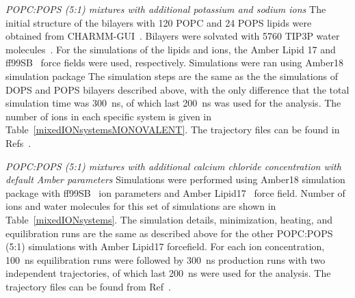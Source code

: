 \documentclass[journal=jpcbfk,manuscript=article]{achemso}
\begin{document}
\noindent
{\it POPC:POPS (5:1) mixtures with additional potassium and sodium ions} 
The initial structure of the bilayers with 120 POPC and 24 POPS lipids were obtained from CHARMM-GUI~\cite{lee16,jo18}.
Bilayers were solvated with 5760 TIP3P water molecules~\cite{jorgensen1983comparison}. For the simulations of the lipids and ions,
the Amber Lipid 17 \cite{gould18} and ff99SB~\cite{aqvist90} force fields were used, respectively.
Simulations were ran using Amber18 simulation package \cite{amber18md} 
The simulation steps are the same as the the simulations of
DOPS and POPS bilayers described above, with the only difference that the total simulation time was 300~ns, of which last 200~ns
was used for the analysis. The number of ions in each specific system is given in Table~\ref{mixedIONsystemsMONOVALENT}.
The trajectory files can be found in Refs~.

\noindent
{\it POPC:POPS (5:1) mixtures with additional calcium chloride concentration with default Amber parameters} 
Simulations were performed using Amber18 simulation package \cite{amber18md} with ff99SB~\cite{aqvist90} ion parameters and Amber Lipid17~\cite{gould18} force field. 
Number of ions and water molecules for this set of simulations are shown in Table~\ref{mixedIONsystems}.
The simulation details, minimization, heating, and equilibration runs are the same as described above for the other POPC:POPS (5:1) simulations with Amber Lipid17 forcefield. 
For each ion concentration, 100~ns equilibration runs were followed by 300~ns production runs with two independent trajectories, of which last 200~ns were used for the analysis.
The trajectory files can be found from Ref~.
\end{document}
